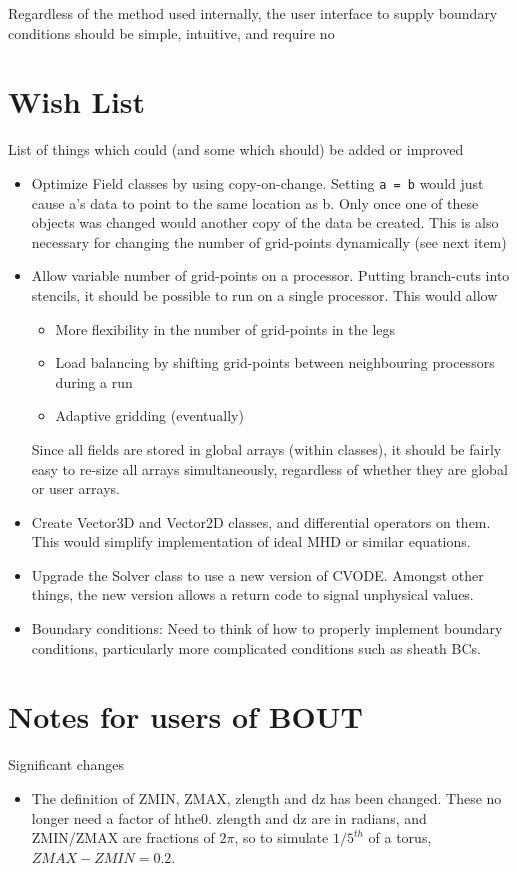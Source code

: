 \documentclass[12pt, a4paper]{article}
\newcommand{\code}[1]{\texttt{#1}}
\begin{document}
Regardless of the method used internally, the user interface to
supply boundary conditions should be simple, intuitive, and
require no 

\section{Wish List}

List of things which could (and some which should) be added or improved

\begin{itemize}
\item Optimize Field classes by using copy-on-change. Setting \code{a = b} would just
  cause a's data to point to the same location as b. Only once one of these objects
  was changed would another copy of the data be created. This is also necessary for
  changing the number of grid-points dynamically (see next item)
\item Allow variable number of grid-points on a processor. Putting branch-cuts into stencils,
 it should be possible to run on a single processor. This would allow
  \begin{itemize}
    \item More flexibility in the number of grid-points in the legs
    \item Load balancing by shifting grid-points between neighbouring processors during a run
    \item Adaptive gridding (eventually)
  \end{itemize}
  Since all fields are stored in global arrays (within classes), it should be fairly easy
  to re-size all arrays simultaneously, regardless of whether they are global or user arrays.
\item Create Vector3D and Vector2D classes, and differential operators on them. This would simplify
implementation of ideal MHD or similar equations.
\item Upgrade the Solver class to use a new version of CVODE. Amongst other things, the
new version allows a return code to signal unphysical values.
\item Boundary conditions: Need to think of how to properly implement boundary conditions,
particularly more complicated conditions such as sheath BCs.
\end{itemize}

\section{Notes for users of BOUT}

Significant changes

\begin{itemize}
\item The definition of ZMIN, ZMAX, zlength and dz has been changed. These no longer
need a factor of hthe0. zlength and dz are in radians, and ZMIN/ZMAX are
fractions of $2\pi$, so to simulate $1/5^{th}$ of a torus, $ZMAX-ZMIN = 0.2$.
\end{itemize}
\end{document}
